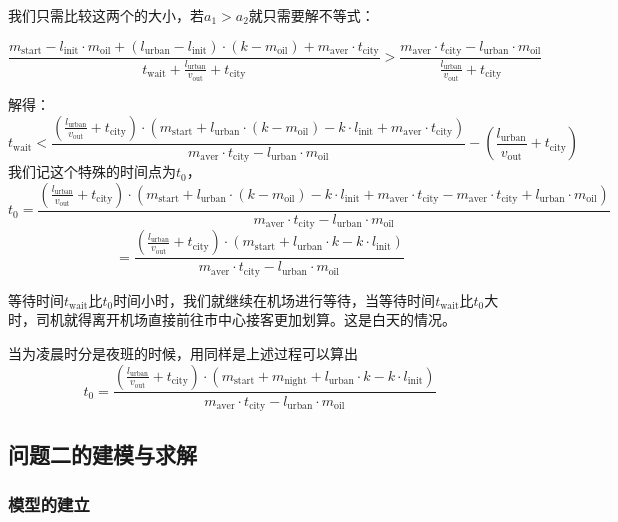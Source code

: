 \documentclass{cumcmthesis}
\begin{document}
我们只需比较这两个的大小，若$a_1>a_2$就只需要解不等式：\par
$$
	\frac{m_{\mathrm{start}}-l_{\mathrm{init}}\cdot m_{\mathrm{oil}}+(l_{\mathrm{urban}}-l_{\mathrm{init}})\cdot (k-m_{\mathrm{oil}})+ m_{\mathrm{aver}}\cdot t_{\mathrm{city}}}{t_{ \mathrm{wait}}+\frac{l_{\mathrm{urban}}}{v_{\mathrm{out}}}+t_{\mathrm{city}}} > \frac{m_{\mathrm{aver}}\cdot t_{\mathrm{city}}-l_{\mathrm{urban}}\cdot m_{\mathrm{oil}}}{\frac{l_{\mathrm{urban}}}{v_{\mathrm{out}}}+t_{\mathrm{city}} }
$$\par
解得：
$$
	t_{\mathrm{wait}}< \frac{\left(\frac{l_{\mathrm{urban}}}{v_{\mathrm{out}}}+t_{\mathrm{city}}\right)\cdot \left(m_{\mathrm{start}}+ l_{\mathrm{urban}}\cdot (k-m_{\mathrm{oil}}) -k\cdot l_{\mathrm{init}} +   m_{\mathrm{aver}}\cdot t_{\mathrm{city}}\right)}{ m_{\mathrm{aver}}\cdot t_{\mathrm{city}}-l_{\mathrm{urban}}\cdot m_{\mathrm{oil}}} - \left(\frac{l_{\mathrm{urban}}}{v_{\mathrm{out}}}+t_{\mathrm{city}}\right)
$$
我们记这个特殊的时间点为$t_0$，
$$
	t_0=  \frac{\left(\frac{l_{\mathrm{urban}}}{v_{\mathrm{out}}}+t_{\mathrm{city}}\right)\cdot \left(m_{\mathrm{start}}+ l_{\mathrm{urban}}\cdot (k-m_{\mathrm{oil}}) -k\cdot l_{\mathrm{init}} +   m_{\mathrm{aver}}\cdot t_{\mathrm{city}}-m_{\mathrm{aver}}\cdot t_{\mathrm{city}}+l_{\mathrm{urban}}\cdot m_{\mathrm{oil}}\right)}{ m_{\mathrm{aver}}\cdot t_{\mathrm{city}}-l_{\mathrm{urban}}\cdot m_{\mathrm{oil}}}
$$ $$
	= \frac{\left(\frac{l_{\mathrm{urban}}}{v_{\mathrm{out}}}+t_{\mathrm{city}}\right)\cdot \left(m_{\mathrm{start}}+ l_{\mathrm{urban}}\cdot k -k\cdot l_{\mathrm{init}} \right)}{ m_{\mathrm{aver}}\cdot t_{\mathrm{city}}-l_{\mathrm{urban}}\cdot m_{\mathrm{oil}}}
$$\par
等待时间$t_{\mathrm{wait}}$比$t_0$时间小时，我们就继续在机场进行等待，当等待时间$t_{\mathrm{wait}}$比$t_0$大时，司机就得离开机场直接前往市中心接客更加划算。这是白天的情况。\par
当为凌晨时分是夜班的时候，用同样是上述过程可以算出
$$
	t_0= \frac{\left(\frac{l_{\mathrm{urban}}}{v_{\mathrm{out}}}+t_{\mathrm{city}}\right)\cdot \left(m_{\mathrm{start}}+ m_{\mathrm{night}} + l_{\mathrm{urban}}\cdot k -k\cdot l_{\mathrm{init}} \right)}{ m_{\mathrm{aver}}\cdot t_{\mathrm{city}}-l_{\mathrm{urban}}\cdot m_{\mathrm{oil}}}
$$
\newpage 
\subsection{问题二的建模与求解}

\subsubsection{模型的建立}
\end{document}
